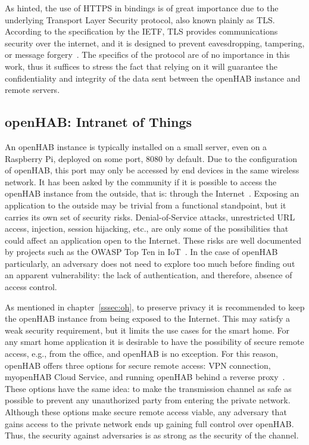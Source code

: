 \documentclass[12pt]{article}
\begin{document}
As hinted, the use of HTTPS in bindings is of great importance due to the underlying Transport Layer Security protocol, also known plainly as TLS. According to the specification by the IETF, TLS provides communications security over the internet, and it is designed to prevent eavesdropping, tampering, or message forgery~\cite{RFC5246}. The specifics of the protocol are of no importance in this work, thus it suffices to stress the fact that relying on it will guarantee the confidentiality and integrity of the data sent between the openHAB instance and remote servers.

\subsection{openHAB: Intranet of Things}

An openHAB instance is typically installed on a small server, even on a Raspberry Pi, deployed on some port, 8080 by default. Due to the configuration of openHAB, this port may only be accessed by end devices in the same wireless network. It has been asked by the community if it is possible to access the openHAB instance from the outside, that is: through the Internet~\cite{openhab_05}. Exposing an application to the outside may be trivial from a functional standpoint, but it carries its own set of security risks. Denial-of-Service attacks, unrestricted URL access, injection, session hijacking, etc., are only some of the possibilities that could affect an application open to the Internet. These risks are well documented by projects such as the OWASP Top Ten in IoT~\cite{owasp}. In the case of openHAB particularly, an adversary does not need to explore too much before finding out an apparent vulnerability: the lack of authentication, and therefore, absence of access control.

As mentioned in chapter~\ref{sssec:oh}, to preserve privacy it is recommended to keep the openHAB instance from being exposed to the Internet. This may satisfy a weak security requirement, but it limits the use cases for the smart home. For any smart home application it is desirable to have the possibility of secure remote access, e.g., from the office, and openHAB is no exception. For this reason, openHAB offers three options for secure remote access: VPN connection, myopenHAB Cloud Service, and running openHAB behind a reverse proxy~\cite{openhab_04}. These options have the same idea: to make the transmission channel as safe as possible to prevent any unauthorized party from entering the private network. Although these options make secure remote access viable, any adversary that gains access to the private network ends up gaining full control over openHAB. Thus, the security against adversaries is as strong as the security of the channel.
\end{document}
